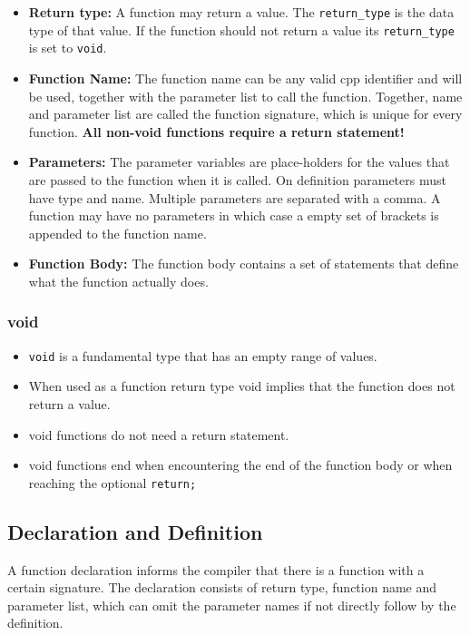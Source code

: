 \documentclass[10pt,a4paper]{scrartcl}
\begin{document}
\begin{multicols*}{2}
\begin{itemize}
\item \textbf{Return type: } A function may return a value. The \verb+return_type+ is the data type of that value. If the function should not return a value its \verb+return_type+ is set to \verb+void+.
\item \textbf{Function Name:} The function name can be any valid cpp identifier and will be used, together with the parameter list to call the function. Together, name and parameter list are called the function signature, which is unique for every function. \textbf{All non-void functions require a return statement!}
\item \textbf{Parameters:} The parameter variables are place-holders for the values that are passed to the function when it is called. On definition parameters must have type and name. Multiple parameters are separated with a comma. A function may have no parameters in which case a empty set of brackets is appended to the function name.
\item \textbf{Function Body:} The function body contains a set of statements that define what the function actually does.
\end{itemize}

\subsubsection{void}

\begin{itemize}
\item \verb+void+ is a fundamental type that has an empty range of values.
\item When used as a function return type void implies that the function does not return a value.
\item void functions do not need a return statement.
\item void functions end when encountering the end of the function body or when reaching the optional \verb+return;+
\end{itemize}

\subsection{Declaration and Definition}

A function declaration informs the compiler that there is a function with a certain signature. The declaration consists of return type, function name and parameter list, which can omit the parameter names if not directly follow by the definition.


\end{multicols*}
\end{document}
